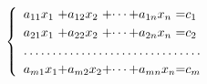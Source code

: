 \documentclass{book}
\begin{document}
\begin{equation*}\begin{cases}
\begin{array}{*{3}{l@{+}}l@{=}l}
a_{11}x_{1} & a_{12}x_{2} & \cdots &
a_{1n}x_{n} & c_{1}\\
a_{21}x_{1} & a_{22}x_{2} & \cdots &
a_{2n}x_{n} & c_{2}\\
\hdotsfor{5}\\
a_{m1}x_{1} & a_{m2}x_{2} & \cdots &
a_{mn}x_{n} & c_{m}
\end{array}
\end{cases}\end{equation*}
\end{document}
